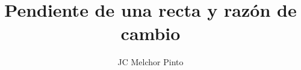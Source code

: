 \documentclass[12pt,addpoints,answers]{guia}
\title{Pendiente de una recta y razón de cambio}
\author{JC Melchor Pinto}
\begin{document}
\pagestyle{headandfoot}

\INFO

\begin{questions}
    \questionboxed[15] 
    \questionboxed[15] 
    \questionboxed[15] 
\end{questions}
\end{document}
